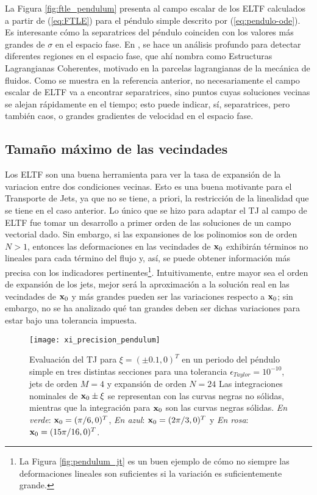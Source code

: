 La Figura \ref{fig:ftle_pendulum} presenta al campo escalar de los ELTF calculados a partir de (\ref{eq:FTLE}) para el péndulo simple descrito por (\ref{eq:pendulo-ode}). Es interesante cómo la separatrices del péndulo coinciden con los valores más grandes de $\sigma$ en el espacio fase. En \cite{Haller2011}, se hace un análisis profundo para detectar diferentes regiones en el espacio fase, que ahí nombra como Estructuras Lagrangianas Coherentes, motivado en la parcelas lagrangianas de la mecánica de fluidos. Como se muestra en la referencia anterior, no necesariamente el campo escalar de ELTF va a encontrar separatrices, sino puntos cuyas soluciones vecinas se alejan rápidamente en el tiempo; esto puede indicar, sí, separatrices, pero también caos, o grandes gradientes de velocidad en el espacio fase.


\pagebreak
\subsection{Tamaño máximo de las vecindades}
\label{sec:ximax}

Los ELTF son una buena herramienta para ver la tasa de expansión de la variacion entre dos condiciones vecinas. Esto es una buena motivante para el Transporte de Jets, ya que no se tiene, a priori, la restricción de la linealidad que se tiene en el caso anterior. Lo único que se hizo para adaptar el TJ al campo de ELTF fue tomar un desarrollo a primer orden de las soluciones de un campo vectorial dado. Sin embargo, si las expansiones de los polinomios son de orden $N > 1$, entonces las deformaciones en las vecindades de $\mathbf{x}_0$ exhibirán términos no lineales para cada término del flujo y, así, se puede obtener información más precisa con los indicadores pertinentes\footnote{La Figura \ref{fig:pendulum_jt} es un buen ejemplo de cómo no siempre las deformaciones lineales son suficientes si la variación es suficientemente grande.}. Intuitivamente, entre mayor sea el orden de expansión de los jets, mejor será la aproximación a la solución real en las vecindades de $\mathbf{x}_0$ y más grandes pueden ser las variaciones respecto a $\mathbf{x}_0$; sin embargo, no se ha analizado qué tan grandes deben ser dichas variaciones para estar bajo una tolerancia impuesta.

\begin{figure}[h!]
	\centering
	\texttt{[image: xi\_precision\_pendulum]}
	\caption{Evaluación del TJ para $\xi = ( \pm 0.1, 0)^T$ en un periodo del péndulo simple en tres distintas secciones para una tolerancia $\epsilon_{Taylor} = 10^{-10}$, jets de orden $M=4$ y expansión de orden $N=24$ Las integraciones nominales de $\mathbf{x}_0 \pm \xi$ se representan con las curvas negras no sólidas, mientras que la integración para $\mathbf{x}_0$ son las curvas negras sólidas. \textit{En verde}: $\mathbf{x}_0 = (\pi/6, 0)^T$, \textit{En azul}: $\mathbf{x}_0 = (2\pi/3, 0)^T$ y \textit{En rosa}: $\mathbf{x}_0 = (15\pi/16, 0)^T$.}
	\label{fig:xi_precision_pendulum}
\end{figure}

